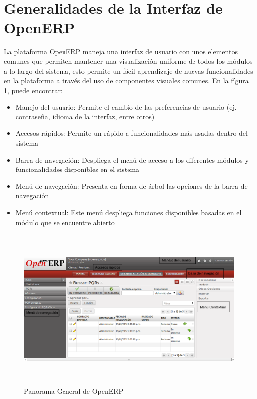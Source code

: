 \section{Generalidades de la Interfaz de OpenERP}
La plataforma OpenERP maneja una interfaz de usuario con unos elementos comunes que permiten mantener una visualización uniforme de todos los módulos a lo largo del sistema, esto permite un fácil aprendizaje de nuevas funcionalidades en la plataforma a través del uso de componentes visuales comunes. En la fígura \ref{fig:enviroment}, puede encontrar:
\begin{itemize}
 \item Manejo del usuario: Permite el cambio de las preferencias de usuario (ej. contraseña, idioma de la interfaz, entre otros)
 \item Accesos rápidos: Permite un rápido a funcionalidades más usadas dentro del sistema
 \item Barra de navegación: Despliega el menú de acceso a los diferentes módulos y funcionalidades disponibles en el sistema
 \item Menú de navegación: Presenta en forma de árbol las opciones de la barra de navegación
 \item Menú contextual: Este menú despliega funciones disponibles basadas en el módulo que se encuentre abierto
\end{itemize}

\begin{figure}[H]
 \centering
 \includegraphics[width=17cm,height=8cm]{./Imagenes/enviroment.png}
 \caption{Panorama General de OpenERP}
 \label{fig:enviroment}
\end{figure}

